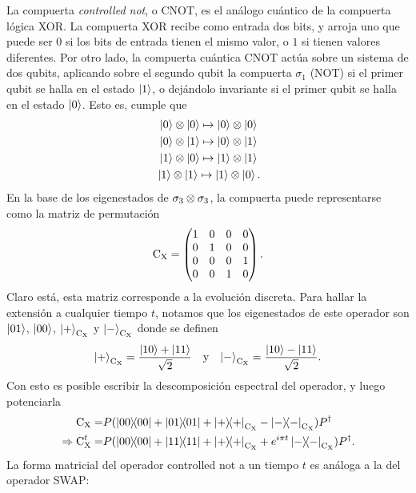 La compuerta \textit{controlled not}, o CNOT, es el análogo cuántico de la compuerta lógica XOR. La compuerta XOR recibe como entrada dos bits, y arroja uno que puede ser $0$ si los bits de entrada tienen el mismo valor, o $1$ si tienen valores diferentes. Por otro lado, la compuerta cuántica CNOT actúa sobre un sistema de dos qubits, aplicando sobre el segundo qubit la compuerta $\sigma_{1}$ (NOT) si el primer qubit se halla en el estado $\ket{1}$, o dejándolo invariante si el primer qubit se halla en el estado $\ket{0}$. Esto es, cumple que \cite{Chuang}
\begin{align*}
    \ket{0}\otimes\ket{0}\mapsto\ket{0}\otimes\ket{0}\\
    \ket{0}\otimes\ket{1}\mapsto\ket{0}\otimes\ket{1}\\
    \ket{1}\otimes\ket{0}\mapsto\ket{1}\otimes\ket{1}\\
    \ket{1}\otimes\ket{1}\mapsto\ket{1}\otimes\ket{0} \rlap{.}
\end{align*}
En la base de los eigenestados de $\sigma_{3}\otimes\sigma_{3}$, la compuerta puede representarse como la matriz de permutación
\begin{equation*}
    \text{C}_{\text{X}}=\begin{pmatrix}
        1&0&0&0\\
        0&1&0&0\\
        0&0&0&1\\
        0&0&1&0
    \end{pmatrix}.
\end{equation*}
Claro está, esta matriz corresponde a la evolución discreta. Para hallar la extensión a cualquier tiempo $t$, notamos que los eigenestados de este operador son $\ket{01}$, $\ket{00}$, $\ket{+}_{\text{C}_{\text{X}}}$ y $\ket{-}_{\text{C}_{\text{X}}}$ donde se definen
\begin{align*}
  \ket{+}_{\text{C}_{\text{X}}}=\frac{\ket{10}+\ket{11}}{\sqrt{2}} & & \text{y} & & \ket{-}_{\text{C}_{\text{X}}}=\frac{\ket{10}-\ket{11}}{\sqrt{2}}.
\end{align*}
Con esto es posible escribir la descomposición espectral del operador, y luego potenciarla 
\begin{align*}
\cnot=&P(\dyad{00}+\dyad{01}+\dyad{+}_{\cnot}-\dyad{-}_{\cnot})P^{\dag}\\
\Rightarrow \cnot^{t}=&P(\dyad{00}+\dyad{11}+\dyad{+}_{\cnot}+e^{i \pi t}\dyad{-}_{\cnot})P^{\dag}.
\end{align*}
La forma matricial del operador controlled not a un tiempo $t$ es análoga a la del operador SWAP:
